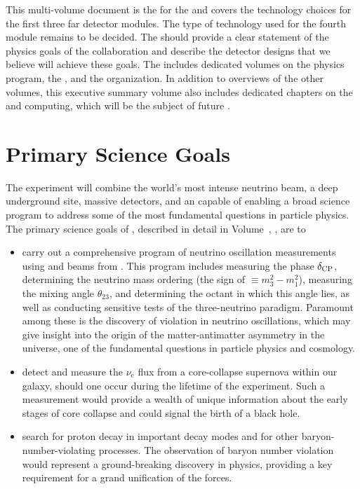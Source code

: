 This multi-volume document is the  for the   and covers the technology choices for the first three far detector modules. The type of  
technology used for the fourth module remains to be decided. The  should provide a clear statement of the physics goals of the  collaboration and describe the detector designs that we believe will achieve these goals. The  includes dedicated volumes on the  physics program, the  , and the   organization. In addition to overviews of the other volumes, this executive summary volume also includes dedicated chapters on the  and computing, which will be the subject of future .

\section{Primary Science Goals}


The  experiment will combine the world's most intense neutrino beam, a deep underground site, massive  detectors, and an    capable of enabling a broad science program to address some of the most fundamental questions in particle physics. 
The primary science goals of , described in detail in Volume~\volnumberphysics{}, \voltitlephysics{}, are to 
\begin{itemize}

\item carry out a comprehensive program of neutrino oscillation measurements using \numu and \anumu beams from . This program includes measuring the   phase $\delta_{\rm CP}$, determining the neutrino mass ordering (the sign of $ \equiv m_3^2-m_1^2$), measuring the mixing angle $\theta_{23}$, and  determining the octant in which this angle lies,
as well as conducting sensitive tests of the three-neutrino paradigm. Paramount among these is the discovery of  violation in neutrino oscillations, which may give insight into the origin of the matter-antimatter asymmetry in the universe, one of the fundamental questions in particle physics and cosmology. 

\item detect and measure the $\nu_\text{e}$ flux from a core-collapse supernova within our galaxy, should one occur during the lifetime of the  experiment. Such a measurement would provide a wealth of unique information about the early stages of core collapse and could signal the birth of a black hole.
    
\item search for proton decay in important decay modes and for other baryon-number-violating processes. The observation of baryon number violation would represent a ground-breaking discovery in physics, providing a key requirement for a grand unification of the forces. 

\end{itemize}

